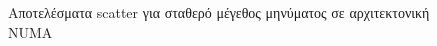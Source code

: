 \begin{figure}[H]
    \caption{Αποτελέσματα scatter για σταθερό μέγεθος μηνύματος σε αρχιτεκτονική NUMA}
        \label{fig:scatter_sizes_NUMA}
\end{figure}



%
%
